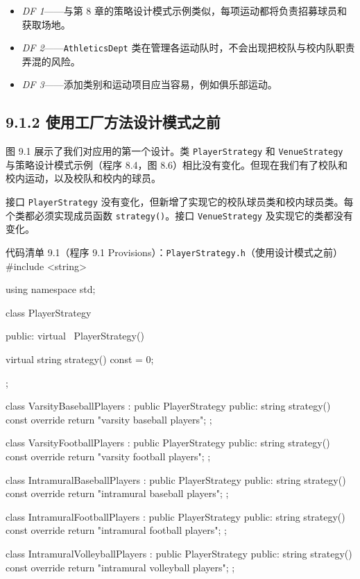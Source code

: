 \begin{itemize}
\item \emph{DF 1}——与第 8 章的策略设计模式示例类似，每项运动都将负责招募球员和获取场地。
\item \emph{DF 2}——\texttt{Athletics\allowbreak{}Dept} 类在管理各运动队时，不会出现把校队与校内队职责弄混的风险。
\item \emph{DF 3}——添加类别和运动项目应当容易，例如俱乐部运动。
\end{itemize}

\subsection{9.1.2 使用工厂方法设计模式之前}

图 9.1 展示了我们对应用的第一个设计。类 \texttt{Player\allowbreak{}Strategy} 和 \texttt{Venue\allowbreak{}Strategy} 与策略设计模式示例（程序 8.4，图 8.6）相比没有变化。但现在我们有了校队和校内运动，以及校队和校内的球员。


接口 \texttt{Player\allowbreak{}Strategy} 没有变化，但新增了实现它的校队球员类和校内球员类。每个类都必须实现成员函数 \texttt{strategy(\allowbreak{})\allowbreak{}}。接口 \texttt{Venue\allowbreak{}Strategy} 及实现它的类都没有变化。

\begin{codeboxt}{代码清单 9.1（程序 9.1 Provisions）：\texttt{Player\allowbreak{}Strategy.\allowbreak{}h}（使用设计模式之前）}
#include <string>

using namespace std;

class PlayerStrategy
{
public:
    virtual ~PlayerStrategy() {}

    virtual string strategy() const = 0;
};

class VarsityBaseballPlayers : public PlayerStrategy
{
public:
    string strategy() const override
    {
        return "varsity baseball players";
    }
};

class VarsityFootballPlayers : public PlayerStrategy
{
public:
    string strategy() const override
    {
        return "varsity football players";
    }
};

class IntramuralBaseballPlayers : public PlayerStrategy
{
public:
    string strategy() const override
    {
        return "intramural baseball players";
    }
};

class IntramuralFootballPlayers : public PlayerStrategy
{
public:
    string strategy() const override
    {
        return "intramural football players";
    }
};

class IntramuralVolleyballPlayers : public PlayerStrategy
{
public:
    string strategy() const override
    {
        return "intramural volleyball players";
    }
};
\end{codeboxt}

